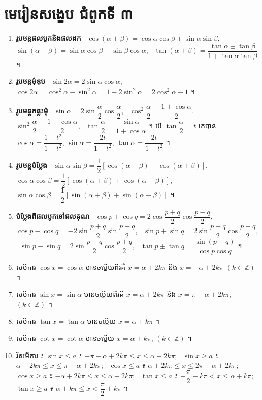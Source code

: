 \section*{មេរៀនសង្ខេប ជំពូកទី ៣}
\begin{note}[មេរៀនសង្ខេប]
\begin{enumerate}[1]
  \item \textbf{រូបមន្តផលបូកនិងផលដក} \
  $\cos(\alpha \pm \beta) = \cos\alpha\cos\beta \mp \sin\alpha\sin\beta$, \ $\sin(\alpha \pm \beta) = \sin\alpha\cos\beta \pm \sin\beta\cos\alpha$, \ $\tan(\alpha \pm \beta) = \dfrac{\tan\alpha \pm \tan\beta}{1 \mp \tan\alpha\tan\beta}$ ។
  \item \textbf{រូបមន្តមុំឌុប} \ $\sin 2\alpha = 2\sin\alpha\cos\alpha$, \ $\cos 2\alpha = \cos^2\alpha - \sin^2\alpha = 1 - 2\sin^2\alpha = 2\cos^2\alpha - 1$ ។
  \item \textbf{រូបមន្តកន្លះមុំ} \ $\sin\alpha = 2\sin\dfrac{\alpha}{2}\cos\dfrac{\alpha}{2}$, \ $\cos^2\dfrac{\alpha}{2} = \dfrac{1 + \cos\alpha}{2}$, \ $\sin^2\dfrac{\alpha}{2} = \dfrac{1 - \cos\alpha}{2}$, \ $\tan\dfrac{\alpha}{2} = \dfrac{\sin\alpha}{1 + \cos\alpha}$ ។ បើ $\tan\dfrac{\alpha}{2} = t$ គេបាន $\cos\alpha = \dfrac{1 - t^2}{1 + t^2}$, $\sin\alpha = \dfrac{2t}{1 + t^2}$, $\tan\alpha = \dfrac{2t}{1 - t^2}$ ។
  \item \textbf{រូបមន្តបំប្លែង} \ $\sin\alpha\sin\beta = \dfrac{1}{2}[\cos(\alpha - \beta) - \cos(\alpha + \beta)]$, \ $\cos\alpha\cos\beta = \dfrac{1}{2}[\cos(\alpha + \beta) + \cos(\alpha - \beta)]$, \ $\sin\alpha\cos\beta = \dfrac{1}{2}[\sin(\alpha + \beta) + \sin(\alpha - \beta)]$ ។
  \item \textbf{បំប្លែងពីផលបូកទៅផលគុណ} \ $\cos p + \cos q = 2\cos\dfrac{p + q}{2}\cos\dfrac{p - q}{2}$, \ $\cos p - \cos q = -2\sin\dfrac{p + q}{2}\sin\dfrac{p - q}{2}$, \ $\sin p + \sin q = 2\sin\dfrac{p + q}{2}\cos\dfrac{p - q}{2}$, \ $\sin p - \sin q = 2\sin\dfrac{p - q}{2}\cos\dfrac{p + q}{2}$, \ $\tan p \pm \tan q = \dfrac{\sin(p \pm q)}{\cos p\cos q}$ ។
  \item សមីការ $\cos x = \cos\alpha$ មានចម្លើយពីរគឺ $x = \alpha + 2k\pi$ និង $x = -\alpha + 2k\pi$ $(k \in \mathbb{Z})$ ។
  \item សមីការ $\sin x = \sin\alpha$ មានចម្លើយពីរគឺ $x = \alpha + 2k\pi$ និង $x = \pi - \alpha + 2k\pi$, $(k \in \mathbb{Z})$ ។
  \item សមីការ $\tan x = \tan\alpha$ មានចម្លើយ $x = \alpha + k\pi$ ។
  \item សមីការ $\cot x = \cot\alpha$ មានចម្លើយ $x = \alpha + k\pi$, $(k \in \mathbb{Z})$ ។
  \item វិសមីការ ៖ $\sin x \le a$ ៖ $-\pi - \alpha + 2k\pi \le x \le \alpha + 2k\pi$; \ $\sin x \ge a$ ៖ $\alpha + 2k\pi \le x \le \pi - \alpha + 2k\pi$; \ $\cos x \le a$ ៖ $\alpha + 2k\pi \le x \le 2\pi - \alpha + 2k\pi$; \ $\cos x \ge a$ ៖ $-\alpha + 2k\pi \le x \le \alpha + 2k\pi$; \ $\tan x \le a$ ៖ $-\dfrac{\pi}{2} + k\pi < x \le \alpha + k\pi$; \ $\tan x \ge a$ ៖ $\alpha + k\pi \le x < \dfrac{\pi}{2} + k\pi$ ។
\end{enumerate}
\end{note}

